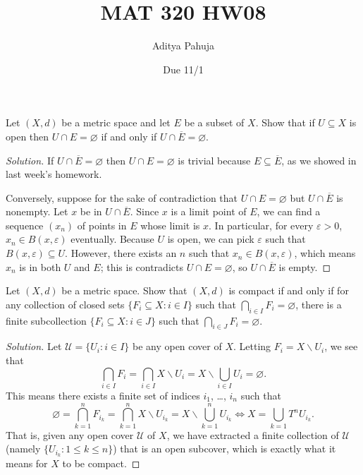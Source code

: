 \documentclass[11pt]{scrartcl}
\title{\vspace{-2em}MAT 320 HW08}
\author{\large Aditya Pahuja}
\date{\large Due 11/1}
\providecommand{\ol}{\overline}
\providecommand{\eps}{\varepsilon}
\providecommand{\setdiff}{\smallsetminus}
\newenvironment{soln}{\begin{proof}[Solution]}{\end{proof}}
\begin{document}
\maketitle

\begin{problem}
	Let $(X, d)$ be a metric space and let $E$ be a subset of $X$.
	Show that if $U\subseteq X$ is open then
	$U\cap E = \varnothing$ if and only if $U\cap\ol E = \varnothing$.
\end{problem}

\begin{soln}
	If $U\cap\ol E = \varnothing$ then $U\cap E = \varnothing$ is trivial
	because $E\subseteq\ol E$, as we showed in last week's homework.
	
	Conversely, suppose for the sake of contradiction that
	$U\cap E = \varnothing$ but $U\cap \ol E$ is nonempty.
	Let $x$ be in $U\cap \ol E$. Since $x$ is a limit point of $E$,
	we can find a sequence $(x_n)$ of points in $E$
	whose limit is $x$. In particular, for every $\eps > 0$,
	$x_n\in B(x,\eps)$ eventually.
	Because $U$ is open, we can pick $\eps$ such that $B(x, \eps)\subseteq U$.
	However, there exists an $n$ such that $x_n\in B(x,\eps)$,
	which means $x_n$ is in both $U$ and $E$; this is contradicts
	$U\cap E = \varnothing$, so $U\cap\ol E$ is empty.
\end{soln}

\begin{problem}
	Let $(X, d)$ be a metric space.
	Show that $(X, d)$ is compact if and only if
	for any collection of closed sets $\{F_i\subseteq X : i\in I\}$
	such that $\bigcap_{i\in I} F_i = \varnothing$,
	there is a finite subcollection $\{F_i\subseteq X:i\in J\}$
	such that $\bigcap_{i\in J} F_i = \varnothing$.
\end{problem}
\begin{soln}
	Let $\mathcal U = \{U_i : i\in I\}$ be any open cover of $X$.
	Letting $F_i = X\setdiff U_i$, we see that
	\[\bigcap_{i\in I} F_i = \bigcap_{i\in I} X\setdiff U_i
	= X\setdiff \bigcup_{i\in I} U_i = \varnothing.\]
	This means there exists a finite set of indices $i_1$, \dots, $i_n$
	such that
	\[\varnothing = \bigcap_{k=1}^n F_{i_k} =
	\bigcap_{k=1}^n X\setdiff U_{i_k} = X\setdiff\bigcup_{k=1}^n U_{i_k}
	\iff X = \bigcup_{k=1}T^n U_{i_k}.\]
	That is, given any open cover $\mathcal U$ of $X$,
	we have extracted a finite collection of $\mathcal U$
	(namely $\{U_{i_k} : 1\le k\le n\}$)
	that is an open subcover, which is exactly what it means
	for $X$ to be compact.
\end{soln}
\end{document}
